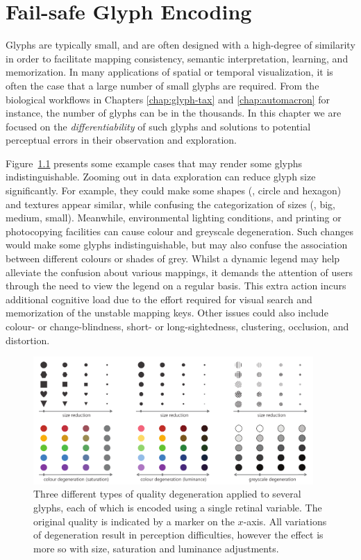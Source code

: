 \chapter{Fail-safe Glyph Encoding}
\label{chap:fail_safe}

Glyphs are typically small, and are often designed with a high-degree of similarity in order to facilitate mapping consistency, semantic interpretation, learning, and memorization.
In many applications of spatial or temporal visualization, it is often the case that a large number of small glyphs are required.
From the biological workflows in Chapters \ref{chap:glyph-tax} and \ref{chap:automacron} for instance, the number of glyphs can be in the thousands.
In this chapter we are focused on the \emph{differentiability} of such glyphs and solutions to potential perceptual errors in their observation and exploration.

Figure~\ref{fig:reduction_degradation} presents some example cases that may render some glyphs indistinguishable. 
Zooming out in data exploration can reduce glyph size significantly.
For example, they could make some shapes (\eg, circle and hexagon) and textures appear similar, while confusing the categorization of sizes (\eg, big, medium, small).
Meanwhile, environmental lighting conditions, and printing or photocopying facilities can cause colour and greyscale degeneration.
Such changes would make some glyphs indistinguishable, but may also confuse the association between different colours or shades of grey.
Whilst a dynamic legend may help alleviate the confusion about various mappings, it demands the attention of users through the need to view the legend on a regular basis.
This extra action incurs additional cognitive load due to the effort required for visual search and memorization of the unstable mapping keys.
Other issues could also include colour- or change-blindness, short- or long-sightedness, clustering, occlusion, and distortion.

\begin{figure}[t]
\begin{center}
\includegraphics[width=0.95\textwidth]{images/filesystem/Unsafe}
\end{center}
\caption{Three different types of quality degeneration applied to several glyphs, each of which is encoded using a single retinal variable.
The original quality is indicated by a marker on the $x$-axis.
All variations of degeneration result in perception difficulties, however the effect is more so with size, saturation and luminance adjustments.}
\label{fig:reduction_degradation}
\end{figure} 

